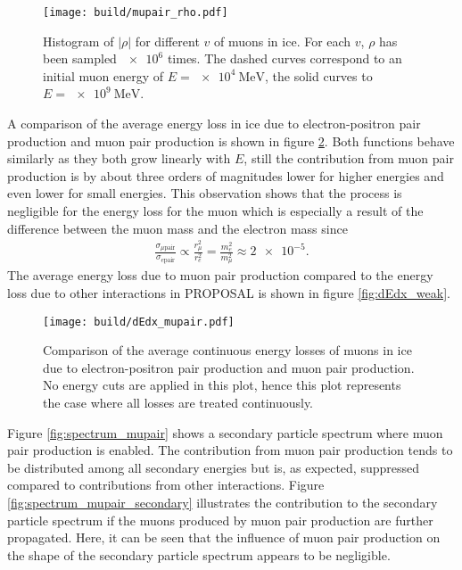 \begin{figure}
    \centering
    \texttt{[image: build/mupair\_rho.pdf]}
    \caption{Histogram of $\lvert\rho\rvert$ for different $v$ of muons in ice. For each $v$, $\rho$ has been sampled $\num{e6}$ times. The dashed curves correspond to an initial muon energy of $E=\SI{e4}{\mega\electronvolt}$, the solid curves to $E = \SI{e9}{\mega\electronvolt}$.}
    \label{fig:rho_mupair}
\end{figure}

A comparison of the average energy loss in ice due to electron-positron pair production and muon pair production is shown in figure \ref{fig:dEdx_mupair}.
Both functions behave similarly as they both grow linearly with $E$, still the contribution from muon pair production is by about three orders of magnitudes lower for higher energies and even lower for small energies.
This observation shows that the process is negligible for the energy loss for the muon which is especially a result of the difference between the muon mass and the electron mass since 
\begin{align*}
	\frac{\sigma_{\mu \text{pair}}}{\sigma_{e \text{pair}}} \propto \frac{r_{\mu}^2}{r_e^2} = \frac{m_e^2}{m_{\mu}^2} \approx \num{2e-5}.
\end{align*}
The average energy loss due to muon pair production compared to the energy loss due to other interactions in PROPOSAL is shown in figure \ref{fig:dEdx_weak}.

\begin{figure}
    \centering
    \texttt{[image: build/dEdx\_mupair.pdf]}
    \caption{Comparison of the average continuous energy losses of muons in ice due to electron-positron pair production \cite{epair_correction, osti_4563918} and muon pair production. No energy cuts are applied in this plot, hence this plot represents the case where all losses are treated continuously.}
    \label{fig:dEdx_mupair}
\end{figure}

Figure \ref{fig:spectrum_mupair} shows a secondary particle spectrum where muon pair production is enabled.
The contribution from muon pair production tends to be distributed among all secondary energies but is, as expected, suppressed compared to contributions from other interactions.
Figure \ref{fig:spectrum_mupair_secondary} illustrates the contribution to the secondary particle spectrum if the muons produced by muon pair production are further propagated.
Here, it can be seen that the influence of muon pair production on the shape of the secondary particle spectrum appears to be negligible. 

